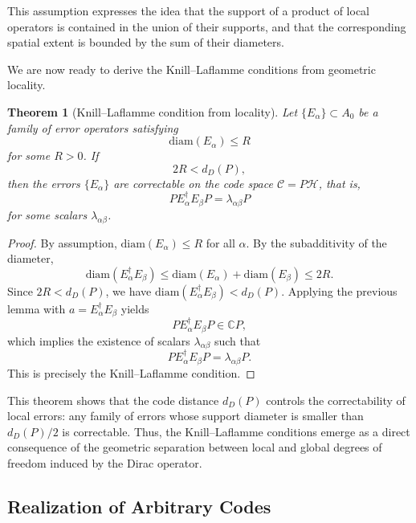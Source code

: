 \documentclass[12pt]{article}
\theoremstyle{definition} %
\theoremstyle{plain} %
\newtheorem{theorem}{Theorem}[section]
\theoremstyle{remark} %
\theoremstyle{underline}
\begin{document}
This assumption expresses the idea that the support of a product of local operators is contained in the union of their supports, and that the corresponding spatial extent is bounded by the sum of their diameters.

We are now ready to derive the Knill--Laflamme conditions from geometric locality.

\begin{theorem}[Knill--Laflamme condition from locality]
    Let $\{E_\alpha\}\subset A_0$ be a family of error operators satisfying
    \[
        \mathrm{diam}(E_\alpha)\le R
    \]
    for some $R>0$. If
    \[
        2R < d_D(P),
    \]
    then the errors $\{E_\alpha\}$ are correctable on the code space $\mathcal{C}=P\mathcal{H}$, that is,
    \[
        P E_\alpha^\dagger E_\beta P = \lambda_{\alpha\beta} P
    \]
    for some scalars $\lambda_{\alpha\beta}$.
\end{theorem}

\begin{proof}
    By assumption, $\mathrm{diam}(E_\alpha)\le R$ for all $\alpha$. By the subadditivity of the diameter,
    \[
        \mathrm{diam}(E_\alpha^\dagger E_\beta)
        \le \mathrm{diam}(E_\alpha)+\mathrm{diam}(E_\beta)
        \le 2R.
    \]
    Since $2R< d_D(P)$, we have $\mathrm{diam}(E_\alpha^\dagger E_\beta)< d_D(P)$. Applying the previous lemma with $a=E_\alpha^\dagger E_\beta$ yields
    \[
        P E_\alpha^\dagger E_\beta P \in \mathbb{C}P,
    \]
    which implies the existence of scalars $\lambda_{\alpha\beta}$ such that
    \[
        P E_\alpha^\dagger E_\beta P = \lambda_{\alpha\beta} P.
    \]
    This is precisely the Knill--Laflamme condition.
\end{proof}

This theorem shows that the code distance $d_D(P)$ controls the correctability of local errors: any family of errors whose support diameter is smaller than $d_D(P)/2$ is correctable. Thus, the Knill--Laflamme conditions emerge as a direct consequence of the geometric separation between local and global degrees of freedom induced by the Dirac operator.

\subsection{Realization of Arbitrary Codes}
\end{document}
